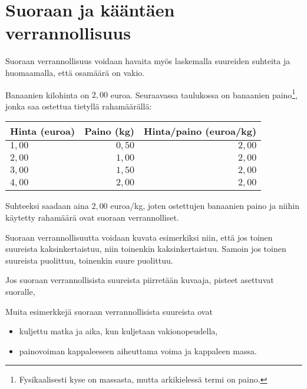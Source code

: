 \chapter{Suoraan ja kääntäen verrannollisuus}


Suoraan verrannollisuus voidaan havaita myös laskemalla suureiden
suhteita ja huomaamalla, että osamäärä on vakio.

\begin{esimerkki}
Banaanien kilohinta on $2,00$ euroa. Seuraavassa taulukossa on
banaanien paino\footnote{Fysikaalisesti kyse on massasta, mutta
arkikielessä termi on paino.}, jonka saa ostettua tietyllä rahamäärällä:
\begin{center} 
\begin{tabular}{|l|r|r|}
\hline
Hinta (euroa) & Paino (kg) & Hinta/paino (euroa/kg) \\
\hline
$1,00$ & $0,50$ & $2,00$ \\
$2,00$ & $1,00$ & $2,00$ \\
$3,00$ & $1,50$ & $2,00$ \\
$4,00$ & $2,00$ & $2,00$ \\
\hline
\end{tabular}
\end{center}
Suhteeksi saadaan aina $2,00$ euroa/kg, joten ostettujen banaanien paino
ja niihin käytetty rahamäärä ovat suoraan verrannolliset.
\end{esimerkki}

Suoraan verrannollisuutta voidaan kuvata esimerkiksi niin, että jos
toinen suureista kaksinkertaistuu, niin toinenkin kaksinkertaistuu.
Samoin jos toinen suureista puolittuu, toinenkin suure puolittuu.

Jos suoraan verrannollisista suureista piirretään kuvaaja, pisteet
asettuvat suoralle,


Muita esimerkkejä suoraan verrannollisista suureista ovat
\begin{itemize}
    \item kuljettu matka ja aika, kun kuljetaan vakionopeudella,
    \item painovoiman kappaleeseen aiheuttama voima ja kappaleen massa.
\end{itemize}


